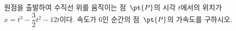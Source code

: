 원점을 출발하여 수직선 위를 움직이는 점~$\pt{P}$의 시각 $t$에서의 위치가 $x=t^3-\dfrac{3}{2}t^2-12t$이다. 속도가 $6$인 순간의 점~$\pt{P}$의 가속도를 구하시오.
